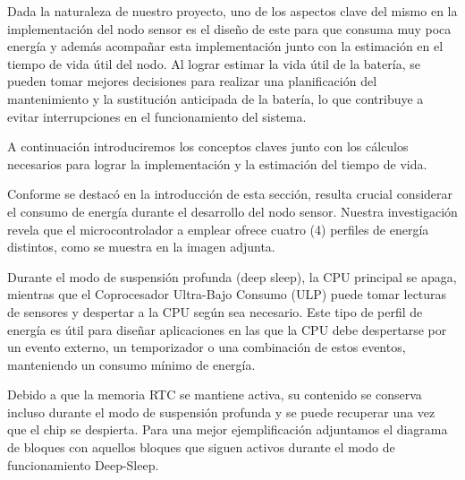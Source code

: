 
Dada la naturaleza de nuestro proyecto, uno de los aspectos clave del mismo en la
implementación del nodo sensor es el diseño de este para que consuma muy poca energía y
además acompañar esta implementación junto con la estimación en el tiempo de vida útil
del nodo.
Al lograr estimar la vida útil de la batería, se pueden tomar mejores decisiones para
realizar una planificación del mantenimiento y la sustitución anticipada de la batería,
lo que contribuye a evitar interrupciones en el funcionamiento del sistema.

A continuación introduciremos los conceptos claves junto con los cálculos necesarios
para lograr la implementación y la estimación del tiempo de vida.

Conforme se destacó en la introducción de esta sección, resulta crucial considerar el
consumo de energía durante el desarrollo del nodo sensor. Nuestra investigación revela
que el microcontrolador a emplear ofrece cuatro (4) perfiles de energía distintos, como
se muestra en la imagen adjunta.


Durante el modo de suspensión profunda (deep sleep), la CPU principal se apaga, mientras
que el Coprocesador Ultra-Bajo Consumo (ULP) puede tomar lecturas de sensores y
despertar a la CPU según sea necesario. Este tipo de perfil de energía es útil para
diseñar aplicaciones en las que la CPU debe despertarse por un evento externo, un
temporizador o una combinación de estos eventos, manteniendo un consumo mínimo de
energía.

Debido a que la memoria RTC se mantiene activa, su contenido se conserva incluso durante
el modo de suspensión profunda y se puede recuperar una vez que el chip se despierta.
Para una mejor ejemplificación adjuntamos el diagrama de bloques con aquellos bloques
que siguen activos durante el modo de funcionamiento Deep-Sleep.


